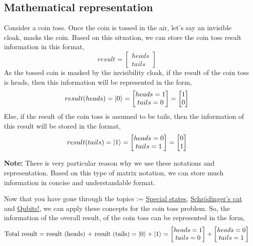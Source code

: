 \documentclass{article}
\begin{document}
\subsection{Mathematical representation}
\label{Mathematical representation}
Consider a coin toss. Once the coin is tossed in the air, let's say an invisible cloak, masks the coin.  
Based on this situation, we can store the coin toss result information in this format,
\begin{equation*}
    result = \begin{bmatrix}
        heads \\ tails
    \end{bmatrix} 
\end{equation*}
As the tossed coin is masked by the invisibility cloak, if the result of the coin toss is heads, then this information will be represented in the form,
\begin{equation}
    result(heads) = \ket{0} = \begin{bmatrix}
        heads = 1 \\ tails = 0
    \end{bmatrix} = \begin{bmatrix}
        1 \\ 0
    \end{bmatrix}
\end{equation}
Else, if the result of the coin toss is assumed to be tails, then the information of this result will be stored in the format,
\begin{equation*}
    result(tails) = \ket{1} = \begin{bmatrix}
        heads = 0 \\ tails = 1
    \end{bmatrix} = \begin{bmatrix}
        0 \\ 1 
    \end{bmatrix}
\end{equation*}

\textbf{Note:} There is very particular reason why we use these notations and representation. Based on this type of matrix notation, we can store much information in concise and understandable format.

Now that you have gone through the topics := \hyperref[subsec: Special States]{Special states}, \hyperref[subsec:Schrödinger's cat]{Schrödinger’s cat} and \hyperref[subsec:Qubits!]{Qubits!}, we can apply these concepts for the coin toss problem. So, the information of the overall result, of the coin toss can be represented in the form,
\begin{equation*}
    \text{Total result} = \text{result (heads) + result (tails)} = \ket{0} + \ket{1} = \begin{bmatrix}
        heads = 1 \\ tails = 0
    \end{bmatrix} + \begin{bmatrix}
        heads = 0 \\ tails = 1
    \end{bmatrix}
\end{equation*}
\end{document}
